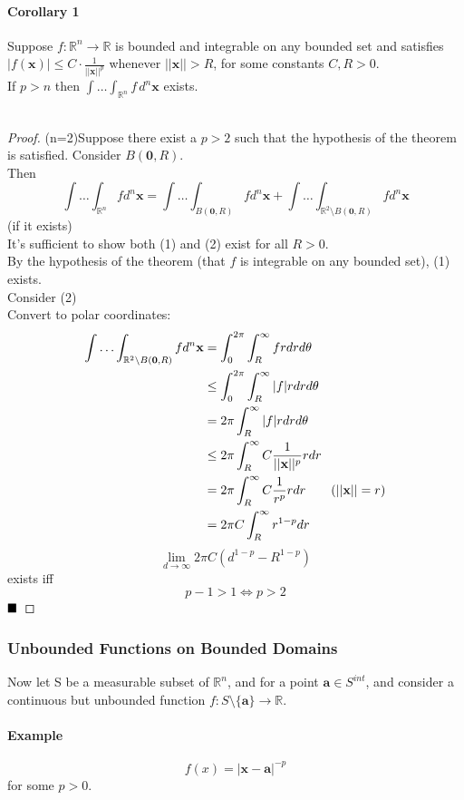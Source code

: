 \documentclass[11pt]{article}
\newcommand{\tb}[1]{\textbf{#1}}
\newcommand{\real}[0]{\mathbb{R}}
\newcommand{\vx}[0]{\tb{x}}
\newcommand{\vo}[0]{\tb{0}}
\newcommand{\va}[0]{\tb{a}}
\newcommand{\qed}[0]{$\hfill\blacksquare$}
\begin{document}
\paragraph{Corollary 1} Suppose $f:\real^n \rightarrow \real$ is bounded and integrable on any bounded set and satisfies $|f(\vx)| \leq C \cdot \frac{1}{||\vx||^p}$ whenever $||\vx|| > R$, for some constants $C,R > 0$.\\
If $p>n$ then $\int\hdots \int_{\real^n}f\,d^n\vx$ exists.\\\\
\begin{proof}
(n=2)Suppose there exist a $p > 2$ such that the hypothesis of the theorem is satisfied. Consider $B(\vo,R)$.\\
Then $$\int\hdots \int_{\real^n}fd^n\vx = \int\hdots \int_{B(\vo,R)}fd^n\vx + \int\hdots \int_{\real^2 \setminus B(\vo, R)}fd^n\vx$$
(if it exists)\\
It's sufficient to show both (1) and (2) exist for all $R>0$.\\
By the hypothesis of the theorem (that $f$ is integrable on any bounded set), (1) exists.\\
Consider (2)\\
Convert to polar coordinates:
\begin{align*}
	\int\hdots \int_{\real^2 \setminus B(\vo, R)}fd^n\vx &= \int_0^{2\pi}\int_R^\infty frdrd\theta\\
	&\leq \int_0^{2\pi}\int_R^\infty|f|rdrd\theta\\
	&= 2\pi \int_R^\infty|f|rdrd\theta\\
	&\leq 2\pi \int_R^\infty C \frac{1}{||\vx||^p}rdr\\
	&= 2\pi \int_R^\infty C \frac{1}{r^p}rdr \tag{$||\vx|| = r$}\\
	&= 2\pi C\int_R^\infty r^{1-p}dr\\
\end{align*}
$$\underset{d\rightarrow\infty}{\lim}2\pi C(d^{1-p}-R^{1-p})$$ exists iff $$ p - 1> 1 \iff p>2$$ \qed
\end{proof}

\subsubsection{Unbounded Functions on Bounded Domains}
Now let S be a measurable subset of $\real^n$, and for a point $\tb{a} \in S^{int}$, and consider a continuous but unbounded function $f: S\setminus\{\va\} \rightarrow \real$.\\
\paragraph{Example} $$f(x) = |\vx - \va|^{-p}$$ for some $p>0$.
\end{document}
